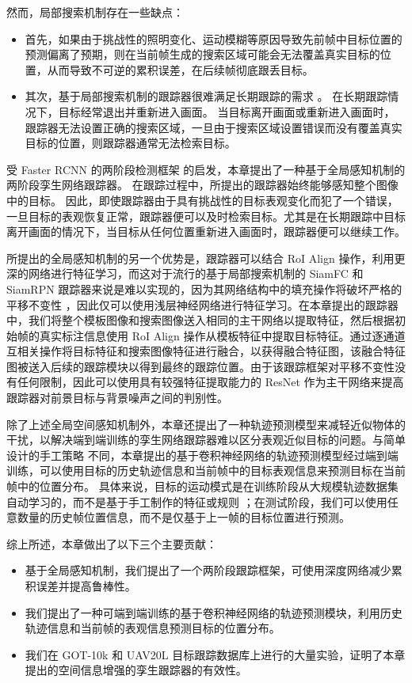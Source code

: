然而，局部搜索机制存在一些缺点：

\begin{itemize}
\item 首先，如果由于挑战性的照明变化、运动模糊等原因导致先前帧中目标位置的预测偏离了预期，则在当前帧生成的搜索区域可能会无法覆盖真实目标的位置，从而导致不可逆的累积误差，在后续帧彻底跟丢目标。
\item 其次，基于局部搜索机制的跟踪器很难满足长期跟踪的需求 \cite{kalal2011tracking, hong2015multi}。
在长期跟踪情况下，目标经常退出并重新进入画面。
当目标离开画面或重新进入画面时，跟踪器无法设置正确的搜索区域，一旦由于搜索区域设置错误而没有覆盖真实目标的位置，则跟踪器通常无法检索目标。
\end{itemize}

受 Faster RCNN 的两阶段检测框架 \cite{ren2015faster} 的启发，本章提出了一种基于全局感知机制的两阶段孪生网络跟踪器。
在跟踪过程中，所提出的跟踪器始终能够感知整个图像中的目标。
因此，即使跟踪器由于具有挑战性的目标表观变化而犯了一个错误，一旦目标的表观恢复正常，跟踪器便可以及时检索目标。尤其是在长期跟踪中目标离开画面的情况下，当目标从任何位置重新进入画面时，跟踪器便可以继续工作。

所提出的全局感知机制的另一个优势是，跟踪器可以结合 RoI Align \cite{He2018MaskR} 操作，利用更深的网络进行特征学习，而这对于流行的基于局部搜索机制的 SiamFC \cite{SiamFC} 和 SiamRPN \cite{SiamRPN} 跟踪器来说是难以实现的，因为其网络结构中的填充操作将破坏严格的平移不变性 \cite{SiamRPN++}，因此仅可以使用浅层神经网络进行特征学习。在本章提出的跟踪器中，我们将整个模板图像和搜索图像送入相同的主干网络以提取特征，然后根据初始帧的真实标注信息使用 RoI Align 操作从模板特征中提取目标特征。通过逐通道互相关操作将目标特征和搜索图像特征进行融合，以获得融合特征图，该融合特征图被送入后续的跟踪模块以得到最终的跟踪位置。由于该跟踪框架对平移不变性没有任何限制，因此可以使用具有较强特征提取能力的 ResNet \cite{he2016deep} 作为主干网络来提高跟踪器对前景目标与背景噪声之间的判别性。

除了上述全局空间感知机制外，本章还提出了一种轨迹预测模型来减轻近似物体的干扰，以解决端到端训练的孪生网络跟踪器难以区分表观近似目标的问题。与简单设计的手工策略 \cite{SiamFC, SiamRPN} 不同，本章提出的基于卷积神经网络的轨迹预测模型经过端到端训练，可以使用目标的历史轨迹信息和当前帧中的目标表观信息来预测目标在当前帧中的位置分布。
具体来说，目标的运动模式是在训练阶段从大规模轨迹数据集自动学习的，而不是基于手工制作的特征或规则 \cite{iswanto2017visual}；在测试阶段，我们可以使用任意数量的历史帧位置信息，而不是仅基于上一帧的目标位置进行预测。

综上所述，本章做出了以下三个主要贡献：
\begin{itemize}
\item 基于全局感知机制，我们提出了一个两阶段跟踪框架，可使用深度网络减少累积误差并提高鲁棒性。
\item 我们提出了一种可端到端训练的基于卷积神经网络的轨迹预测模块，利用历史轨迹信息和当前帧的表观信息预测目标的位置分布。
\item 我们在 GOT-10k \cite{GOT-10k} 和 UAV20L \cite{mueller2016benchmark} 目标跟踪数据库上进行的大量实验，证明了本章提出的空间信息增强的孪生跟踪器的有效性。
\end{itemize}

